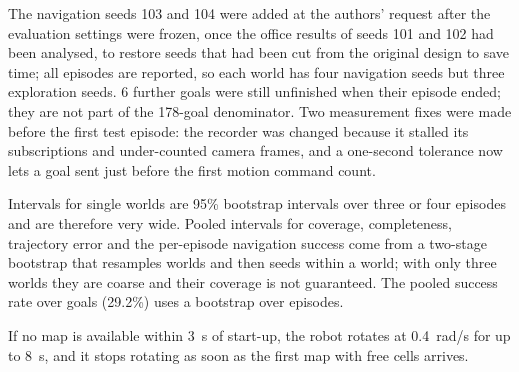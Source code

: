 The navigation seeds 103 and 104 were added at the authors' request after the evaluation settings were frozen, once the office results of seeds 101 and 102 had been analysed, to restore seeds that had been cut from the original design to save time; all episodes are reported, so each world has four navigation seeds but three exploration seeds. 6 further goals were still unfinished when their episode ended; they are not part of the 178-goal denominator. Two measurement fixes were made before the first test episode: the recorder was changed because it stalled its subscriptions and under-counted camera frames, and a one-second tolerance now lets a goal sent just before the first motion command count.

Intervals for single worlds are 95\% bootstrap intervals over three or four episodes and are therefore very wide. Pooled intervals for coverage, completeness, trajectory error and the per-episode navigation success come from a two-stage bootstrap that resamples worlds and then seeds within a world; with only three worlds they are coarse and their coverage is not guaranteed. The pooled success rate over goals (29.2\%) uses a bootstrap over episodes.

If no map is available within 3~s of start-up, the robot rotates at 0.4~rad/s for up to 8~s, and it stops rotating as soon as the first map with free cells arrives.
